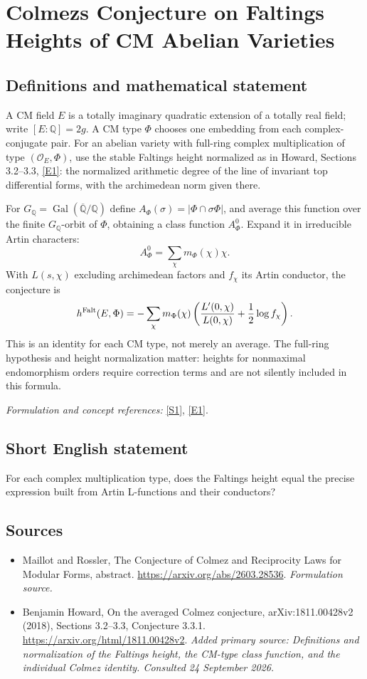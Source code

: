 \documentclass[11pt]{article}
\begin{document}
\section*{\texorpdfstring{Colmezs Conjecture on Faltings Heights of CM Abelian Varieties}{Colmezs Conjecture on Faltings Heights of CM Abelian Varieties}}\label{30006926}
\subsection{Definitions and mathematical statement}
A CM field $E$ is a totally imaginary quadratic extension of a totally real field; write $[E:{\mathbb{Q}}]=2g$. A CM type $\Phi$ chooses one embedding from each complex-conjugate pair. For an abelian variety with full-ring complex multiplication of type $(\mathcal O_E,\Phi)$, use the stable Faltings height normalized as in Howard, Sections 3.2--3.3, \href{https://arxiv.org/html/1811.00428v2}{[E1]}: the normalized arithmetic degree of the line of invariant top differential forms, with the archimedean norm given there.

For $G_{{\mathbb{Q}}}=\operatorname{Gal}(\overline{{\mathbb{Q}}}/{\mathbb{Q}})$ define $A_\Phi(\sigma)=|\Phi\cap\sigma\Phi|$, and average this function over the finite $G_{{\mathbb{Q}}}$-orbit of $\Phi$, obtaining a class function $A_\Phi^0$. Expand it in irreducible Artin characters:
\[
 A_\Phi^0=\sum_\chi m_\Phi(\chi)\chi.
\]
With $L(s,\chi)$ excluding archimedean factors and $f_\chi$ its Artin conductor, the conjecture is
\[
 h^{\rm Falt}(E,\Phi)=
 -\sum_\chi m_\Phi(\chi)
 \left(\frac{L'(0,\chi)}{L(0,\chi)}+\frac12\log f_\chi\right).
\]
This is an identity for each CM type, not merely an average. The full-ring hypothesis and height normalization matter: heights for nonmaximal endomorphism orders require correction terms and are not silently included in this formula.
\par\smallskip\textit{Formulation and concept references:} \href{https://arxiv.org/abs/2603.28536}{[S1]}, \href{https://arxiv.org/html/1811.00428v2}{[E1]}.

\subsection{Short English statement}
For each complex multiplication type, does the Faltings height equal the precise expression built from Artin L-functions and their conductors?
\subsection{Sources}
\begin{itemize}
\item[S1]Maillot and Rossler, The Conjecture of Colmez and Reciprocity Laws for Modular Forms, abstract.
\url{https://arxiv.org/abs/2603.28536}.
\textit{Formulation source.}
\item[E1]Benjamin Howard, On the averaged Colmez conjecture, arXiv:1811.00428v2 (2018), Sections 3.2–3.3, Conjecture 3.3.1.
\url{https://arxiv.org/html/1811.00428v2}.
\textit{Added primary source: Definitions and normalization of the Faltings height, the CM-type class function, and the individual Colmez identity. Consulted 24 September 2026.}
\end{itemize}
\end{document}
